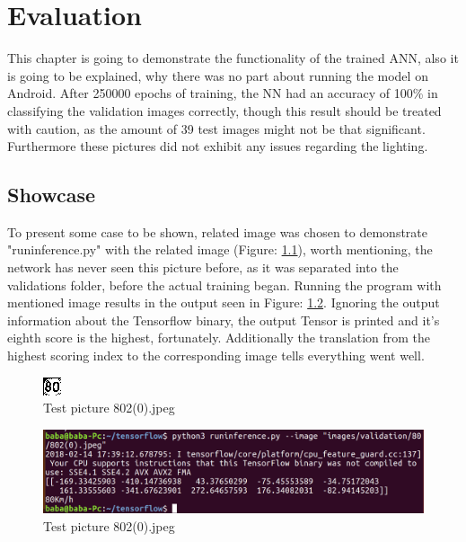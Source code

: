 
\chapter{Evaluation}\label{chapter:Evaluation}
This chapter is going to demonstrate the functionality of the trained ANN, also it is going to be explained, why there was no part about running the model on Android. After 250000 epochs of training, the NN had an accuracy of 100\% in classifying the validation images correctly, though this result should be treated with caution, as the amount of 39 test images might not be that significant. Furthermore these pictures did not exhibit any issues regarding the lighting. 

\section{Showcase}
To present some case to be shown, related image was chosen to demonstrate "runinference.py" with the related image (Figure: \ref{fig:802}), worth mentioning, the network has never seen this picture before, as it was separated into the validations folder, before the actual training began. Running the program with mentioned image results in the output seen in Figure: \ref{fig:programout}. Ignoring the output information about the Tensorflow binary, the output Tensor is printed and it's eighth score is the highest, fortunately. Additionally the translation from the highest scoring index to the corresponding image tells everything went well. 

\begin{figure}[H]
	\centering
	\includegraphics[width=0.4\linewidth]{images/802(0).jpeg}
	\caption{Test picture 802(0).jpeg}\label{fig:802}
\end{figure}


\begin{figure}[H]
	\centering
	\includegraphics[width=\linewidth]{images/program.png}
	\caption{Test picture 802(0).jpeg}\label{fig:programout}
\end{figure}


